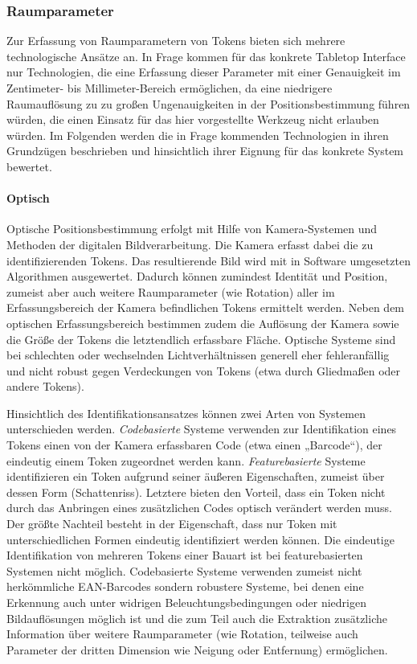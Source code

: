 \subsubsection{Raumparameter} %
\label{ssub:raumparameter}
Zur Erfassung von Raumparametern von Tokens bieten sich mehrere technologische Ansätze an. In Frage kommen für das konkrete Tabletop Interface nur Technologien, die eine Erfassung dieser Parameter mit einer Genauigkeit im Zentimeter- bis Millimeter-Bereich ermöglichen, da eine niedrigere Raumauflösung zu zu großen Ungenauigkeiten in der Positionsbestimmung führen würden, die einen Einsatz für das hier vorgestellte Werkzeug nicht erlauben würden. Im Folgenden werden die in Frage kommenden Technologien in ihren Grundzügen beschrieben und hinsichtlich ihrer Eignung für das konkrete System bewertet.

\paragraph{Optisch} %
\label{par:optisch}

Optische Positionsbestimmung erfolgt mit Hilfe von Kamera-Systemen und Methoden der digitalen Bildverarbeitung. Die Kamera erfasst dabei die zu identifizierenden Tokens. Das resultierende Bild wird mit in Software umgesetzten Algorithmen ausgewertet. Dadurch können zumindest Identität und Position, zumeist aber auch weitere Raumparameter (wie Rotation) aller im Erfassungsbereich der Kamera befindlichen Tokens ermittelt werden. Neben dem optischen Erfassungsbereich bestimmen zudem die Auflösung der Kamera sowie die Größe der Tokens die letztendlich erfassbare Fläche. Optische Systeme sind bei schlechten oder wechselnden Lichtverhältnissen generell eher fehleranfällig und nicht robust gegen Verdeckungen von Tokens (etwa durch Gliedmaßen oder andere Tokens).

Hinsichtlich des Identifikationsansatzes können zwei Arten von Systemen unterschieden werden. \emph{Codebasierte} Systeme verwenden zur Identifikation eines Tokens einen von der Kamera erfassbaren Code (etwa einen „Barcode“), der eindeutig einem Token zugeordnet werden kann. \emph{Featurebasierte} Systeme identifizieren ein Token aufgrund seiner äußeren Eigenschaften, zumeist über dessen Form (Schattenriss). Letztere bieten den Vorteil, dass ein Token nicht durch das Anbringen eines zusätzlichen Codes optisch verändert werden muss. Der größte Nachteil besteht in der Eigenschaft, dass nur Token mit unterschiedlichen Formen eindeutig identifiziert werden können. Die eindeutige Identifikation von mehreren Tokens einer Bauart ist bei featurebasierten Systemen nicht möglich. Codebasierte Systeme verwenden zumeist nicht herkömmliche \gls{EAN}-Barcodes sondern robustere Systeme, bei denen eine Erkennung auch unter widrigen Beleuchtungsbedingungen oder niedrigen Bildauflösungen möglich ist und die zum Teil auch die Extraktion zusätzliche Information über weitere Raumparameter (wie Rotation, teilweise auch Parameter der dritten Dimension wie Neigung oder Entfernung) ermöglichen. 


